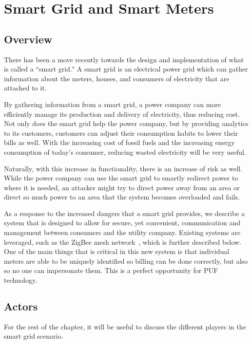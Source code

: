 
\chapter{Smart Grid and Smart Meters}
\label{chapter:doe}

\section{Overview}
There has been a move recently towards the design and implementation of what is called a ``smart grid." A smart
grid is an electrical power grid which can gather information about the meters, houses, and consumers of
electricity that are attached to it.


By gathering information from a smart grid, a power company can more efficiently manage its production and delivery
of electricity, thus reducing cost. Not only does the smart grid help the power company, but by providing analytics to
its customers, customers can adjust their consumption habits to lower their bills as well. With the increasing cost of
fossil fuels and the increasing energy consumption of today's consumer, reducing wasted electricity will be very useful.

Naturally, with this increase in functionality, there is an increase of risk as well. While the power company can use
the smart grid to smartly redirect power to where it is needed, an attacker might try to direct power away from an
area or direct so much power to an area that the system becomes overloaded and fails.

As a response to the increased dangers that a smart grid provides, we describe a system that is designed to allow
for secure, yet convenient, communication and management between consumers and the utility company. Existing
systems are leveraged, such as the ZigBee mesh network~\cite{zigbee}, which is further described below.
One of the main things that is critical in this new system is that individual meters are able to be uniquely identified
so billing can be done correctly, but also so no one can impersonate them. This is a perfect opportunity for PUF
technology.

\section{Actors}
For the rest of the chapter, it will be useful to discuss the different players in the smart grid scenario.

